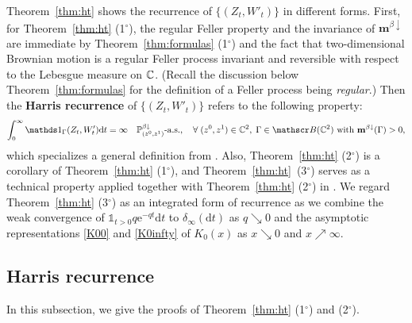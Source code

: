 \documentclass[12pt, twoside]{article}
\numberwithin{figure}{section}
\newcommand{\e}{{\mathrm e}}
\newcommand{\1}{\mathds 1}
\newcommand{\B}{\mathscr B}
\newcommand{\da}{{\downarrow}}
\renewcommand{\P}{{\mathbb P}}
\renewcommand{\d}{{\mathrm d}}
\newcommand{\2}{{\mathbf 1}}
\newcommand{\cc}{{^\circ}}
\begin{document}
Theorem~\ref{thm:ht} shows the recurrence of $\{(Z_t,W'_t)\}$ in different forms. 
First, for
Theorem~\ref{thm:ht} (1$\cc$), the regular Feller property and the invariance of $\mathbf m^{\beta\da}$ are immediate by Theorem~\ref{thm:formulas} (1$\cc$) and the fact that two-dimensional Brownian motion is a regular Feller process invariant and reversible with respect to the Lebesgue measure on $\Bbb C$. (Recall the discussion below Theorem~\ref{thm:formulas} for the definition of a Feller process being \emph{regular}.) Then the {\bf Harris recurrence} of  $\{(Z_t,W'_t)\}$ refers to the following property: 
\begin{align}\label{def:Harris}
\int_0^\infty \1_\Gamma(Z_t,W'_t)\d t=\infty\quad \P^{\beta\da}_{(z^0,z^1)}\mbox{-a.s.},\quad \forall\; (z^0,z^1)\in \Bbb C^2,\; \Gamma\in \B(\Bbb C^2)\mbox{ with }\mathbf m^{\beta\da}(\Gamma)>0,
\end{align}
which specializes a general definition from \cite[p.400]{K:FMP}. Also, Theorem~\ref{thm:ht} (2$\cc$) is a corollary of Theorem~\ref{thm:ht} (1$\cc$), and Theorem~\ref{thm:ht}~(3$\cc$) serves as a technical property applied together with Theorem~\ref{thm:ht} (2$\cc$) in \cite{C:SDBG2}. We regard Theorem~\ref{thm:ht} (3$\cc$) as an integrated form of recurrence as we combine the weak convergence of $\1_{t>0}q\e^{-qt}\d t$ to $\delta_\infty(\d t)$ as $q\searrow 0$ and the asymptotic representations \eqref{K00} and \eqref{K0infty} of $K_0(x)$  as $x\searrow 0$ and $x\nearrow \infty$. 


\subsection{Harris recurrence}\label{sec:ht1}
In this subsection, we give the proofs of Theorem~\ref{thm:ht} (1$\cc$) and (2$\cc$).
 \smallskip 
\end{document}
